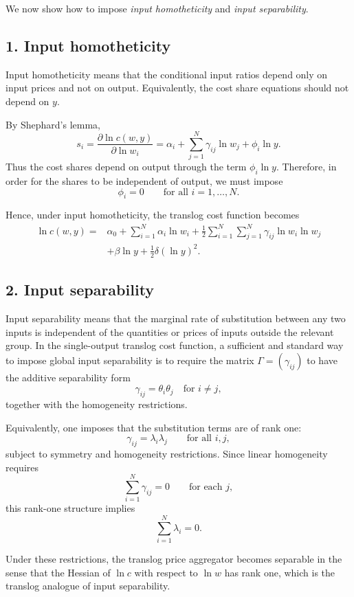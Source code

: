 We now show how to impose \emph{input homotheticity} and \emph{input separability}.

\subsection*{1. Input homotheticity}

Input homotheticity means that the conditional input ratios depend only on input prices and not on output. Equivalently, the cost share equations should not depend on \(y\).

By Shephard's lemma,
\[
s_i
=
\frac{\partial \ln c(w,y)}{\partial \ln w_i}
=
\alpha_i+\sum_{j=1}^N \gamma_{ij}\ln w_j+\phi_i \ln y.
\]
Thus the cost shares depend on output through the term \(\phi_i \ln y\). Therefore, in order for the shares to be independent of output, we must impose
\[
\boxed{\phi_i=0 \qquad \text{for all } i=1,\dots,N.}
\]

Hence, under input homotheticity, the translog cost function becomes
\[
\begin{aligned}
\ln c(w,y)
=
&\alpha_0
+
\sum_{i=1}^N \alpha_i \ln w_i
+
\frac{1}{2}\sum_{i=1}^N \sum_{j=1}^N \gamma_{ij}\ln w_i \ln w_j\\
&+
\beta \ln y
+
\frac{1}{2}\delta (\ln y)^2.
\end{aligned}
\]

\subsection*{2. Input separability}

Input separability means that the marginal rate of substitution between any two inputs is independent of the quantities or prices of inputs outside the relevant group. In the single-output translog cost function, a sufficient and standard way to impose global input separability is to require the matrix \(\Gamma=(\gamma_{ij})\) to have the additive separability form
\[
\gamma_{ij}=\theta_i\theta_j
\quad \text{for } i\neq j,
\]
together with the homogeneity restrictions.

Equivalently, one imposes that the substitution terms are of rank one:
\[
\boxed{\gamma_{ij}=\lambda_i \lambda_j \qquad \text{for all } i,j,}
\]
subject to symmetry and homogeneity restrictions. Since linear homogeneity requires
\[
\sum_{i=1}^N \gamma_{ij}=0 \qquad \text{for each } j,
\]
this rank-one structure implies
\[
\sum_{i=1}^N \lambda_i =0.
\]

Under these restrictions, the translog price aggregator becomes separable in the sense that the Hessian of \(\ln c\) with respect to \(\ln w\) has rank one, which is the translog analogue of input separability.

